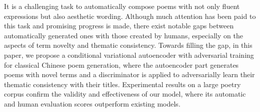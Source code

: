 It is a challenging task to automatically compose poems with not only fluent expressions but also aesthetic wording. Although much attention has been paid to this task and promising progress is made, there exist notable gaps between automatically generated ones with those created by humans, especially on the aspects of term novelty and thematic consistency. Towards filling the gap, in this paper, we propose a conditional variational autoencoder with adversarial training for classical Chinese poem generation, where the autoencoder part generates poems with novel terms and a discriminator is applied to adversarially learn their thematic consistency with their titles. Experimental results on a large poetry corpus confirm the validity and effectiveness of our model, where its automatic and human evaluation scores outperform existing models.
